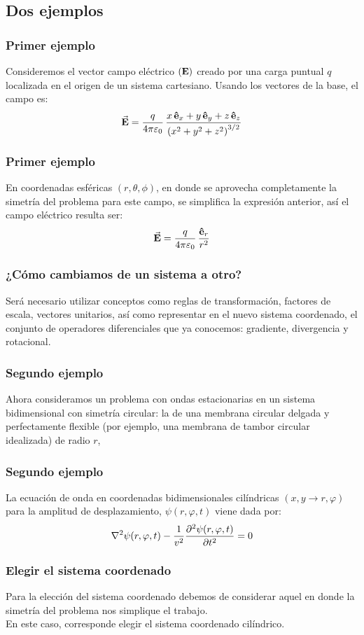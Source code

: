 \documentclass[12pt]{beamer}
\begin{document}
\subsection{Dos ejemplos}
\begin{frame}
\frametitle{Primer ejemplo}
Consideremos el vector campo eléctrico $(\vb{E})$ creado por una carga puntual $q$ localizada en el origen de un sistema cartesiano. Usando los vectores de la base, el campo es:
\begin{align*}
\va{\vb{E}} = \dfrac{q}{4 \pi \varepsilon_{0}} \, \dfrac{x \, \vu{e}_{x} + y \, \vu{e}_{y} + z \, \vu{e}_{z}}{\left( x^{2} + y^{2} + z^{2} \right)^{3/2}}
\end{align*}
\end{frame}
\begin{frame}
\frametitle{Primer ejemplo}
En coordenadas esféricas $(r, \theta, \phi)$, en donde se aprovecha completamente la simetría del problema para este campo, se simplifica la expresión anterior, así el campo eléctrico resulta ser:
\begin{align*}
\va{\vb{E}} = \dfrac{q}{4 \pi \varepsilon_{0}} \, \dfrac{\vu{e}_{r}}{r^{2}}
\end{align*}
\end{frame}
\begin{frame}
\frametitle{¿Cómo cambiamos de un sistema a otro?}
Será necesario utilizar conceptos como reglas de transformación, factores de escala, vectores unitarios, así como representar en el nuevo sistema coordenado, el conjunto de operadores diferenciales que ya conocemos: gradiente, divergencia y rotacional.
\end{frame}
\begin{frame}
\frametitle{Segundo ejemplo}
Ahora consideramos un problema con ondas estacionarias en un sistema bidimensional con simetría circular: la de una membrana circular delgada y perfectamente flexible (por ejemplo, una membrana de tambor circular idealizada) de radio $r$,
\end{frame}
\begin{frame}
\frametitle{Segundo ejemplo}
La ecuación de onda en coordenadas bidimensionales cilíndricas $(x , y \rightarrow r, \varphi)$ para la amplitud de desplazamiento, $\psi (r, \varphi, t)$ viene dada por:
\begin{align*}
\laplacian \psi (r, \varphi, t) - \dfrac{1}{v^{2}} \pdv[2]{\psi (r, \varphi, t)}{t} = 0
\end{align*}
\end{frame}
\begin{frame}
\frametitle{Elegir el sistema coordenado}
Para la elección del sistema coordenado debemos de considerar aquel en donde la simetría del problema nos simplique el trabajo.
\\
\bigskip
\pause
En este caso, corresponde elegir el sistema coordenado cilíndrico.
\end{frame}
\end{document}
